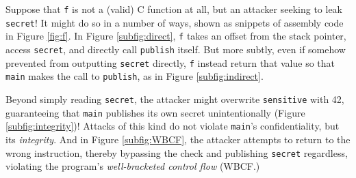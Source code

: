 \documentclass[10pt,conference]{ieeetran}%
\theoremstyle{definition}
\begin{document}
Suppose that {\tt f} is not a (valid) C function at all, but an attacker seeking
to leak {\tt secret}! It might do so in a number of ways, shown as snippets of
assembly code in Figure \ref{fig:f}.
In Figure \ref{subfig:direct}, {\tt f} takes an offset from the stack
pointer, access {\tt secret}, and directly call {\tt publish} itself. But more
subtly, even if somehow prevented from outputting {\tt secret} directly, {\tt f}
instead return that value so that {\tt main} makes the call to {\tt publish},
as in Figure \ref{subfig:indirect}.

Beyond simply reading {\tt secret}, the attacker might overwrite {\tt sensitive}
with 42, guaranteeing that {\tt main} publishes its own secret unintentionally
(Figure \ref{subfig:integrity})!
Attacks of this kind do not violate {\tt main}'s confidentiality, but its
{\it integrity}.
And in Figure \ref{subfig:WBCF}, the attacker attempts to return to the
wrong instruction, thereby bypassing the check and publishing {\tt secret} regardless,
violating the program's {\it well-bracketed control flow} (WBCF.)
\end{document}
